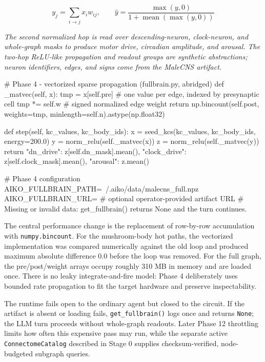 \documentclass[11pt]{article}
\begin{document}
\begin{equation}
y_j=\sum_{i\rightarrow j}x_i w_{ij},\qquad \hat y=\frac{\max(y,0)}{1+\operatorname{mean}(\max(y,0))}
\tag{4}
\end{equation}

\noindent\emph{The second normalized hop is read over descending-neuron, clock-neuron, and whole-graph masks to produce motor drive, circadian amplitude, and arousal. The two-hop ReLU-like propagation and readout groups are synthetic abstractions; neuron identifiers, edges, and signs come from the MaleCNS artifact.}

\begin{CodeBlock}
# Phase 4 - vectorized sparse propagation (fullbrain.py, abridged)
def _matvec(self, x):
    tmp = x[self.pre]        # one value per edge, indexed by presynaptic cell
    tmp *= self.w            # signed normalized edge weight
    return np.bincount(self.post, weights=tmp,
                       minlength=self.n).astype(np.float32)

def step(self, kc_values, kc_body_ids):
    x = seed_kcs(kc_values, kc_body_ids, energy=200.0)
    y = norm_relu(self._matvec(x))
    z = norm_relu(self._matvec(y))
    return {"dn_drive": z[self.dn_mask].mean(),
            "clock_drive": z[self.clock_mask].mean(),
            "arousal": z.mean()}
\end{CodeBlock}

\begin{CodeBlock}
# Phase 4 configuration
AIKO_FULLBRAIN_PATH=~/.aiko/data/malecns_full.npz
AIKO_FULLBRAIN_URL=                 # optional operator-provided artifact URL
# Missing or invalid data: get_fullbrain() returns None and the turn continues.
\end{CodeBlock}

The central performance change is the replacement of row-by-row accumulation with \texttt{numpy.bincount}. For the mushroom-body hot paths, the vectorized implementation was compared numerically against the old loop and produced maximum absolute difference 0.0 before the loop was removed. For the full graph, the pre/post/weight arrays occupy roughly 310 MB in memory and are loaded once. There is no leaky integrate-and-fire model: Phase 4 deliberately uses bounded rate propagation to fit the target hardware and preserve inspectability.

The runtime fails open to the ordinary agent but closed to the circuit. If the artifact is absent or loading fails, \texttt{get\_fullbrain()} logs once and returns \texttt{None}; the LLM turn proceeds without whole-graph readouts. Later Phase 12 throttling limits how often this expensive pass may run, while the separate active \texttt{ConnectomeCatalog} described in Stage 0 supplies checksum-verified, node-budgeted subgraph queries.
\end{document}
